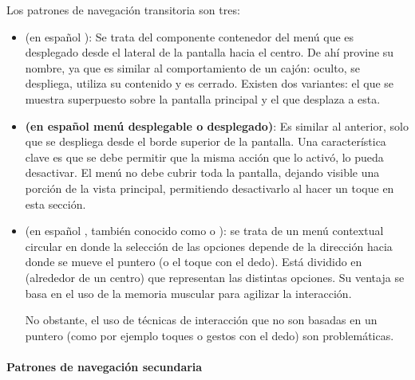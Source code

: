 Los patrones de navegación transitoria\cite{neil2014mobile} son tres:
\begin{itemize}
\item \textbf{} (en español ): Se trata del componente contenedor del menú que es desplegado desde el lateral de la pantalla hacia el centro. De ahí provine su nombre, ya que es similar al comportamiento de un cajón: oculto, se despliega, utiliza su contenido y es cerrado. Existen dos variantes: el que se muestra superpuesto sobre la pantalla principal y el que desplaza a esta.

\item \textbf{ (en español menú desplegable o desplegado)}: Es similar al anterior, solo que se despliega desde el borde superior de la pantalla. Una característica clave es que se debe permitir que la misma acción que lo activó, lo pueda desactivar. El menú no debe cubrir toda la pantalla, dejando visible una porción de la vista principal, permitiendo desactivarlo al hacer un toque en esta sección.


\item \textbf{} (en español , también conocido como  o ): se trata de un menú contextual circular en donde la selección de las opciones depende de la dirección hacia donde se mueve el puntero (o el toque con el dedo). Está dividido en  (alrededor de un centro) que representan las distintas opciones. Su ventaja se basa en el uso de la memoria muscular para agilizar la interacción\cite{hopkins1991design}. 


No obstante, el uso de técnicas de interacción que no son basadas en un puntero (como por ejemplo toques o gestos con el dedo) son problemáticas\cite{leithinger2007improving}.
\end{itemize}

\paragraph{Patrones de navegación secundaria}
\label{navegacion_secundaria}


